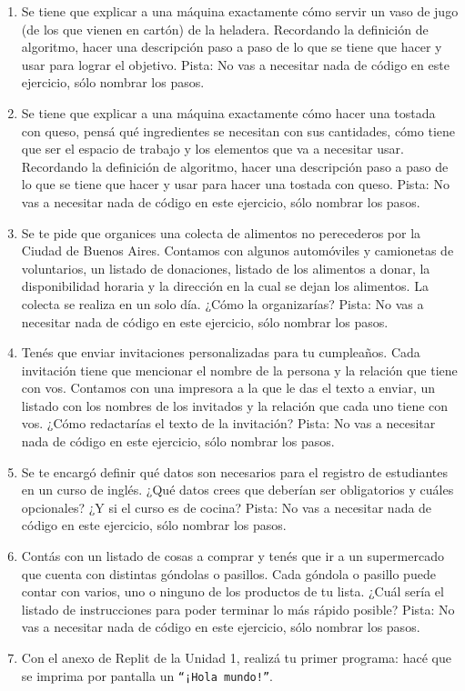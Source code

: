 \documentclass[
  letterpaper,
  DIV=11,
  numbers=noendperiod]{scrreprt}
\begin{document}
\begin{enumerate}
\def\labelenumi{\arabic{enumi}.}
\item
  Se tiene que explicar a una máquina exactamente cómo servir un vaso de
  jugo (de los que vienen en cartón) de la heladera. Recordando la
  definición de algoritmo, hacer una descripción paso a paso de lo que
  se tiene que hacer y usar para lograr el objetivo. Pista: No vas a
  necesitar nada de código en este ejercicio, sólo nombrar los pasos.
\item
  Se tiene que explicar a una máquina exactamente cómo hacer una tostada
  con queso, pensá qué ingredientes se necesitan con sus cantidades,
  cómo tiene que ser el espacio de trabajo y los elementos que va a
  necesitar usar. Recordando la definición de algoritmo, hacer una
  descripción paso a paso de lo que se tiene que hacer y usar para hacer
  una tostada con queso. Pista: No vas a necesitar nada de código en
  este ejercicio, sólo nombrar los pasos.
\item
  Se te pide que organices una colecta de alimentos no perecederos por
  la Ciudad de Buenos Aires. Contamos con algunos automóviles y
  camionetas de voluntarios, un listado de donaciones, listado de los
  alimentos a donar, la disponibilidad horaria y la dirección en la cual
  se dejan los alimentos. La colecta se realiza en un solo día. ¿Cómo la
  organizarías? Pista: No vas a necesitar nada de código en este
  ejercicio, sólo nombrar los pasos.
\item
  Tenés que enviar invitaciones personalizadas para tu cumpleaños. Cada
  invitación tiene que mencionar el nombre de la persona y la relación
  que tiene con vos. Contamos con una impresora a la que le das el texto
  a enviar, un listado con los nombres de los invitados y la relación
  que cada uno tiene con vos. ¿Cómo redactarías el texto de la
  invitación? Pista: No vas a necesitar nada de código en este
  ejercicio, sólo nombrar los pasos.
\item
  Se te encargó definir qué datos son necesarios para el registro de
  estudiantes en un curso de inglés. ¿Qué datos crees que deberían ser
  obligatorios y cuáles opcionales? ¿Y si el curso es de cocina? Pista:
  No vas a necesitar nada de código en este ejercicio, sólo nombrar los
  pasos.
\item
  Contás con un listado de cosas a comprar y tenés que ir a un
  supermercado que cuenta con distintas góndolas o pasillos. Cada
  góndola o pasillo puede contar con varios, uno o ninguno de los
  productos de tu lista. ¿Cuál sería el listado de instrucciones para
  poder terminar lo más rápido posible? Pista: No vas a necesitar nada
  de código en este ejercicio, sólo nombrar los pasos.
\item
  Con el anexo de Replit de la Unidad 1, realizá tu primer programa:
  hacé que se imprima por pantalla un \texttt{“¡Hola\ mundo!”}.
\end{enumerate}
\end{document}
